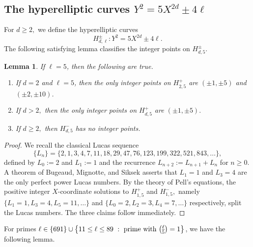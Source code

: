 \documentclass[12pt]{amsart}
\newtheorem{lem}{Lemma}[section]
\newcommand{\?}{\color{red}?}
\newcommand{\leg}[2]{\genfrac{(}{)}{}{}{#1}{#2}}
\numberwithin{equation}{section}
\begin{document}
\subsection{The hyperelliptic curves $Y^2=5X^{2d}\pm 4\ell$}

For $d\geq 2,$ we define the hyperelliptic curves
\begin{equation}
H^{\pm}_{d,\ell}:  Y^2 =5 X^{2d}\pm 4\ell.
\end{equation}
The following satisfying lemma classifies the integer points on $H_{d,5}^{\pm}.$

\begin{lem}\label{AnnalsCorollary}
If $\ell=5$, then the following are true.
\begin{enumerate}
\item If $d=2$ and $\ell=5$, then the only integer points on $H^{+}_{2,5}$ are $(\pm 1, \pm 5)$ and $(\pm 2, \pm 10)$.
\item If $d>2,$ then the only integer points on $H^{+}_{d,5}$ are $(\pm 1, \pm 5).$
\item If $d\geq 2,$ then $H^{-}_{d,5}$ has no integer points.
\end{enumerate}
\end{lem}
\begin{proof}
We recall the classical Lucas sequence $$\{L_n\}=\{2, 1, 3, 4, 7, 11, 18, 29, 47,76, 123, 199, 322, 521, 843,\dots\},$$ defined by
$L_0:=2$ and $L_1:=1$ and the recurrence $L_{n+2}:=L_{n+1}+L_n$ for $n\geq 0$.
A  theorem of Bugeaud, Mignotte, and Siksek \cite{AnnalsFibonacci} asserts that $L_1=1$ and $L_3=4$
are the only perfect power Lucas numbers.
By the theory of Pell's equations, the positive integer $X$-coordinate solutions to
$H^+_{1,5}$ and $H^{-}_{1,5},$
namely $\{L_1=1, L_3= 4,L_5=11,\dots\}$ and
$\{L_0=2, L_2=3, L_4=7,\dots\}$ respectively, split the Lucas numbers. The three claims follow immediately.
\end{proof}

For  primes $\ell \in \{691\}\cup\left \{ 11\leq \ell\leq 89 \ : \  {\text {\rm prime with }} \leg{\ell}{5}=1
\right\}$, we have the following lemma.
\end{document}

